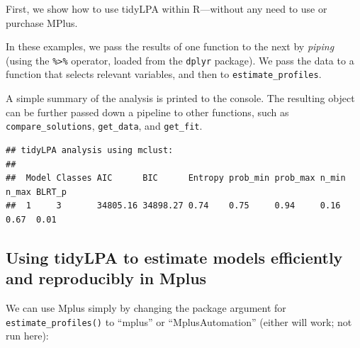 \documentclass[english,man]{apa6}
\newenvironment{Shaded}{\begin{snugshade}}{\end{snugshade}}
\newcommand{\DataTypeTok}[1]{\textcolor[rgb]{0.13,0.29,0.53}{#1}}
\newcommand{\DecValTok}[1]{\textcolor[rgb]{0.00,0.00,0.81}{#1}}
\newcommand{\KeywordTok}[1]{\textcolor[rgb]{0.13,0.29,0.53}{\textbf{#1}}}
\newcommand{\NormalTok}[1]{#1}
\newcommand{\OperatorTok}[1]{\textcolor[rgb]{0.81,0.36,0.00}{\textbf{#1}}}
\newcommand{\StringTok}[1]{\textcolor[rgb]{0.31,0.60,0.02}{#1}}
\begin{document}
First, we show how to use tidyLPA within R---without any need to use or purchase MPlus.

In these examples, we pass the results of one function to the next by \emph{piping}
(using the \texttt{\%\textgreater{}\%} operator, loaded from the \texttt{dplyr} package). We pass the data to
a function that selects relevant variables, and then to \texttt{estimate\_profiles}.

A simple summary of the analysis is printed to the console. The resulting object
can be further passed down a pipeline to other functions, such as
\texttt{compare\_solutions}, \texttt{get\_data}, and \texttt{get\_fit}.

\begin{Shaded}
\end{Shaded}

\begin{verbatim}
## tidyLPA analysis using mclust: 
## 
##  Model Classes AIC      BIC      Entropy prob_min prob_max n_min n_max BLRT_p
##  1     3       34805.16 34898.27 0.74    0.75     0.94     0.16  0.67  0.01
\end{verbatim}

\hypertarget{using-tidylpa-to-estimate-models-efficiently-and-reproducibly-in-mplus}{%
\subsection{Using tidyLPA to estimate models efficiently and reproducibly in Mplus}\label{using-tidylpa-to-estimate-models-efficiently-and-reproducibly-in-mplus}}

We can use Mplus simply by changing the package argument for
\texttt{estimate\_profiles()} to \enquote{mplus} or \enquote{MplusAutomation} (either will work; not run
here):

\begin{Shaded}
\end{Shaded}
\end{document}
